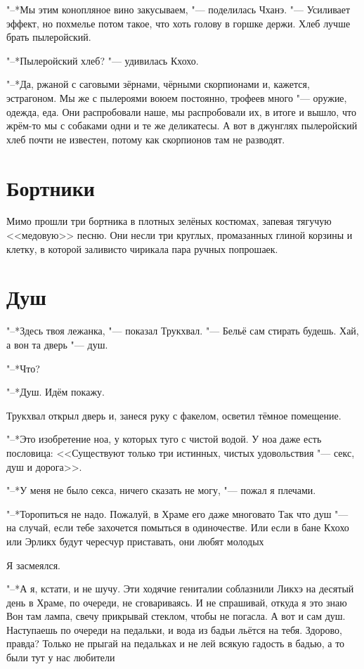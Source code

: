 \documentclass[a4paper,10pt,fleqn]{book}
\newcommand{\ldotst}{\so{...}\xspace}
\begin{document}
"--*Мы этим конопляное вино закусываем, "--- поделилась Чханэ.
"--- Усиливает эффект, но похмелье потом такое, что хоть голову в горшке держи.
Хлеб лучше брать пылеройский.

"--*Пылеройский хлеб? "--- удивилась Кхохо.

"--*Да, ржаной с саговыми зёрнами, чёрными скорпионами и, кажется, эстрагоном.
Мы же с пылероями воюем постоянно, трофеев много "--- оружие, одежда, еда.
Они распробовали наше, мы распробовали их, в итоге и вышло, что жрём-то мы с собаками одни и те же деликатесы.
А вот в джунглях пылеройский хлеб почти не известен, потому как скорпионов там не разводят.

\section{Бортники}

Мимо прошли три бортника в плотных зелёных костюмах, запевая тягучую <<медовую>> песню.
Они несли три круглых, промазанных глиной корзины и клетку, в которой заливисто чирикала пара ручных попрошаек.

\section{Душ}

"--*Здесь твоя лежанка, "--- показал Трукхвал.
"--- Бельё сам стирать будешь.
Хай, а вон та дверь "--- душ.

"--*Что?

"--*Душ.
Идём покажу.

Трукхвал открыл дверь и, занеся руку с факелом, осветил тёмное помещение.

"--*Это изобретение ноа, у которых туго с чистой водой.
У ноа даже есть пословица: <<Существуют только три истинных, чистых удовольствия "--- секс, душ и дорога>>.

"--*У меня не было секса, ничего сказать не могу, "--- пожал я плечами.

"--*Торопиться не надо.
Пожалуй, в Храме его даже многовато\ldotst
Так что душ "--- на случай, если тебе захочется помыться в одиночестве.
Или если в бане Кхохо или Эрликх будут чересчур приставать, они любят молодых\ldotst

Я засмеялся.

"--*А я, кстати, и не шучу.
Эти ходячие гениталии соблазнили Ликхэ на десятый день в Храме, по очереди, не сговариваясь.
И не спрашивай, откуда я это знаю\ldotst
Вон там лампа, свечу прикрывай стеклом, чтобы не погасла.
А вот и сам душ.
Наступаешь по очереди на педальки, и вода из бадьи льётся на тебя.
Здорово, правда?
Только не прыгай на педальках и не лей всякую гадость в бадью, а то были тут у нас любители\ldotst
\end{document}

